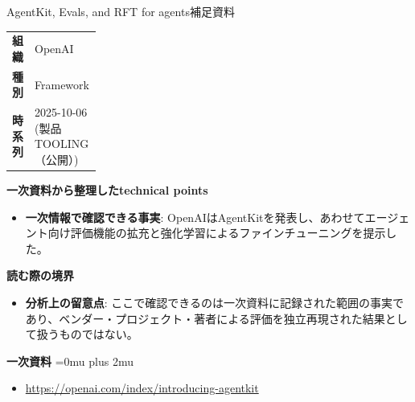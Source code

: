 \begin{technicalnote}{AgentKit, Evals, and RFT for agents}{補足資料}
\begingroup
\begin{tabularx}{\linewidth}{@{}>{\bfseries}p{0.22\linewidth}X@{}}
組織 & OpenAI \\
種別 & Framework \\
時系列 & 2025-10-06 (製品 TOOLING（公開）) \\
\end{tabularx}
\smallskip
{\bfseries 一次資料から整理したtechnical points}
\begin{itemize}[leftmargin=1.5em,itemsep=0.35em]
\item \textbf{一次情報で確認できる事実}: OpenAIはAgentKitを発表し、あわせてエージェント向け評価機能の拡充と強化学習によるファインチューニングを提示した。
\end{itemize}
\begin{minipage}{\linewidth}
{\bfseries 読む際の境界}
\begin{itemize}[leftmargin=1.5em,itemsep=0.35em]
\item \textbf{分析上の留意点}: ここで確認できるのは一次資料に記録された範囲の事実であり、ベンダー・プロジェクト・著者による評価を独立再現された結果として扱うものではない。
\end{itemize}
\begin{samepage}
{\bfseries 一次資料}
\begingroup\sloppy
\Urlmuskip=0mu plus 2mu\relax
\begin{itemize}[leftmargin=1.5em,itemsep=0.25em]
\item {\scriptsize\url{https://openai.com/index/introducing-agentkit}}
\end{itemize}
\endgroup
\end{samepage}
\end{minipage}
\endgroup
\end{technicalnote}
\medskip


